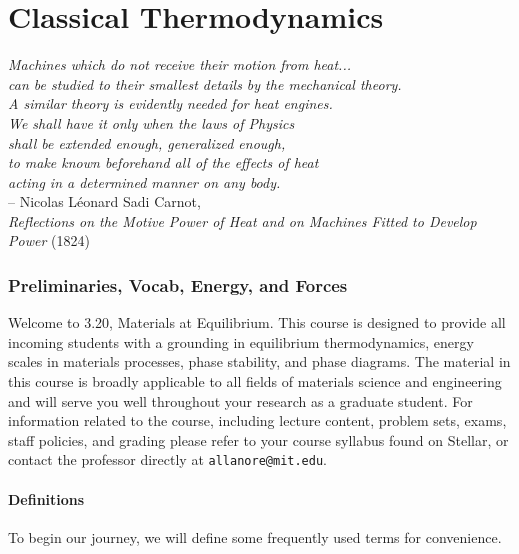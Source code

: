 \documentclass[12pt]{article}
\def\dbar{{\mathchar'26\mkern-12mu d}}
\begin{document}

\tableofcontents
\clearpage
\part{Classical Thermodynamics}
\vspace*{\fill}
\begin{center}
\textit{Machines which do not receive their motion from heat... \\
can be studied to their smallest details by the mechanical theory.\\ 
A similar theory is evidently needed for heat engines.\\
We shall have it only when the laws of Physics\\
 shall be extended enough, generalized enough,\\
to make known beforehand all of the effects of heat\\
acting in a determined manner on any body.} \\
-- Nicolas L\'{e}onard Sadi Carnot, \\
\textit{Reflections on the Motive Power of Heat and on Machines Fitted to Develop Power} (1824)
\end{center}
\vfill %
\clearpage

\section{Preliminaries, Vocab, Energy, and Forces}

Welcome to 3.20, Materials at Equilibrium.  This course is designed to provide all incoming students with a grounding in equilibrium thermodynamics, energy scales in materials processes, phase stability, and phase diagrams.  The material in this course is broadly applicable to all fields of materials science and engineering and will serve you well throughout your research as a graduate student.  For information related to the course, including lecture content, problem sets, exams, staff policies, and grading please refer to your course syllabus found on Stellar, or contact the professor directly at \texttt{allanore@mit.edu}.

\subsection{Definitions}
To begin our journey, we will define some frequently used terms for convenience.
\end{document}
